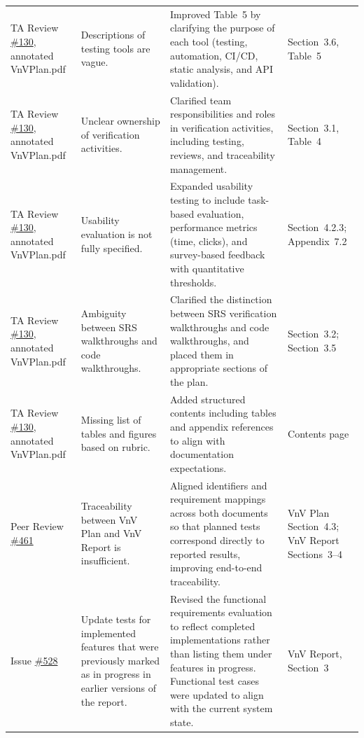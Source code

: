 \documentclass{article}
\begin{document}
\begin{longtable}{p{} p{}
                  p{} p{}}
TA Review \href{https://github.com/thaafei/DomainX/issues/130}{\#130},
annotated VnVPlan.pdf
&
Descriptions of testing tools are vague.
&
Improved Table~5 by clarifying the purpose of each tool (testing,
automation, CI/CD, static analysis, and API validation).
&
Section~3.6, Table~5
\\

TA Review \href{https://github.com/thaafei/DomainX/issues/130}{\#130},
annotated VnVPlan.pdf
&
Unclear ownership of verification activities.
&
Clarified team responsibilities and roles in verification activities,
including testing, reviews, and traceability management.
&
Section~3.1, Table~4
\\

TA Review \href{https://github.com/thaafei/DomainX/issues/130}{\#130},
annotated VnVPlan.pdf
&
Usability evaluation is not fully specified.
&
Expanded usability testing to include task-based evaluation,
performance metrics (time, clicks), and survey-based feedback with
quantitative thresholds.
&
Section~4.2.3; Appendix~7.2
\\

TA Review \href{https://github.com/thaafei/DomainX/issues/130}{\#130},
annotated VnVPlan.pdf
&
Ambiguity between SRS walkthroughs and code walkthroughs.
&
Clarified the distinction between SRS verification walkthroughs and
code walkthroughs, and placed them in appropriate sections of the
plan.
&
Section~3.2; Section~3.5
\\

TA Review \href{https://github.com/thaafei/DomainX/issues/130}{\#130},
annotated VnVPlan.pdf
&
Missing list of tables and figures based on rubric.
&
Added structured contents including tables and appendix references to
align with documentation expectations.
&
Contents page
\\

Peer Review \href{https://github.com/thaafei/DomainX/issues/461}{\#461}
&
Traceability between VnV Plan and VnV Report is insufficient.
&
Aligned identifiers and requirement mappings across both documents so
that planned tests correspond directly to reported results, improving
end-to-end traceability.
&
VnV Plan Section~4.3; VnV Report Sections~3--4
\\

Issue \href{https://github.com/thaafei/DomainX/issues/528}{\#528}
&
Update tests for implemented features that were previously marked as
in progress in earlier versions of the report.
&
Revised the functional requirements evaluation to reflect completed
implementations rather than listing them under features in progress.
Functional test cases were updated to align with the current system
state.
&
VnV Report, Section~3
\\


\end{longtable}
\end{document}
